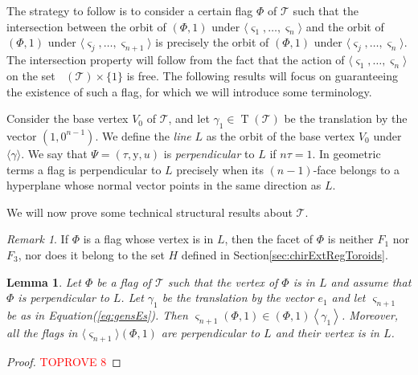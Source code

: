 \documentclass[final]{amsart}
\theoremstyle{plain}
\newtheorem{lem}[thm]{Lemma}
\theoremstyle{definition}
\theoremstyle{remark}
\newtheorem{rem}[thm]{Remark}
\numberwithin{equation}{section}
\renewcommand{\{}{\lbrace}
\renewcommand{\}}{\rbrace}
\newcommand{\cT}{\mathcal{T}}
\newcommand{\cyvec}[1]{{\mathrm{#1}}}
\newcommand{\vy}{\cyvec{y}}
\DeclareMathOperator{\Fw}{\mathcal{F}^{w}}
\DeclareMathOperator{\tras}{T}
\newcommand{\es}{\varsigma}
\begin{document}
The strategy to follow is to consider a certain flag $\Phi$ of  $\cT$ such that the intersection between the orbit of $(\Phi,1)$ under $\langle \es_{1}, \dots, \es_{n} \rangle $ and the orbit of $(\Phi,1)$ under $\langle \es_{j}, \dots, \es_{n+1} \rangle$ is precisely the orbit of $(\Phi,1)$ under  $\langle \es_{j}, \dots, \es_{n} \rangle$. The intersection property will follow from the fact that the action of $\langle \es_{1}, \dots, \es_{n} \rangle$ on the set $\Fw(\cT) \times \{1\}$ is free. The following results will focus on guaranteeing  the existence of such a flag, for which we will introduce some terminology. 







Consider the base vertex $V_0$ of $\cT$, and let $\gamma_{1} \in \tras(\cT)$ be the translation by the vector $(1,0^{n-1})$. 
We define the \emph{line} $L$ as the orbit of the base vertex $V_0$ under $\langle \gamma \rangle$. 
We say that $\Psi=  (\tau, \vy, u)$ is \emph{perpendicular} to $L$ if $n \tau = 1$.
In geometric terms a flag is perpendicular to $L$ precisely when its $(n-1)$-face belongs to a hyperplane whose normal vector points in the same direction as $L$.

We will now prove some technical structural results about $\cT$. 


\begin{rem}\label{rem:noBrincos}
If $\Phi$ is a flag whose vertex is in $L$, then the facet of $\Phi$ is neither $F_1$ nor $F_3$, nor does it belong to the set $H$ defined in Section\nobreakspace \ref {sec:chirExtRegToroids}. 
\end{rem}









 



















\begin{lem}\label{lem:perpUnderLastS} 
  Let $\Phi$ be a flag of $\cT$ such that the vertex of $\Phi$ is in $L$ and assume that $\Phi$ is perpendicular to $L$. 
  Let $\gamma_1$ be the translation by the vector $e_1$ and let $\es_{n+1}$ be as in Equation\nobreakspace \textup {(\ref {eq:gensEs})}. 
  Then $\es_{n+1}(\Phi, 1) \in (\Phi, 1)\left\langle \gamma_{1} \right\rangle $. 
  Moreover,  all the flags in $\langle \es_{n+1} \rangle (\Phi, 1)$ are perpendicular to $L$ and their vertex is in $L$. 
\end{lem}
\begin{proof}\textcolor{red}{TOPROVE 8}\end{proof}
\end{document}

